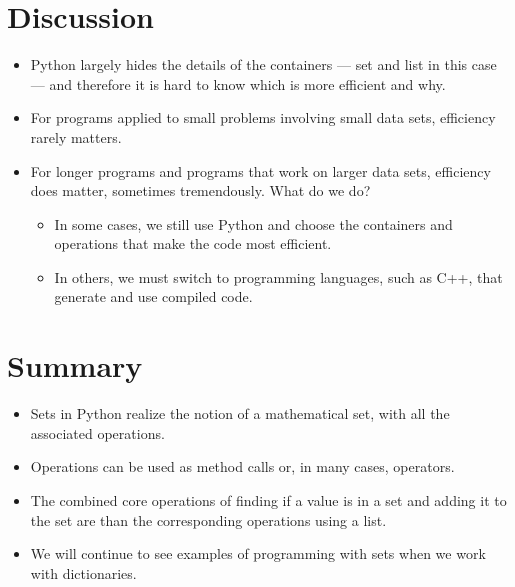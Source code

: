 \documentclass[letterpaper,10pt,english]{sphinxmanual}
\begin{document}
\section{Discussion}
\label{\detokenize{lecture_notes/lec15_sets:discussion}}\begin{itemize}
\item {} 
Python largely hides the details of the containers — set and list in
this case — and therefore it is hard to know which is more efficient
and why.

\item {} 
For programs applied to small problems involving small data sets,
efficiency rarely matters.

\item {} 
For longer programs and programs that work on larger data sets,
efficiency does matter, sometimes tremendously. What do we do?
\begin{itemize}
\item {} 
In some cases, we still use Python and choose the containers and
operations that make the code most efficient.

\item {} 
In others, we must switch to programming languages, such as C++,
that generate and use compiled code.

\end{itemize}

\end{itemize}


\section{Summary}
\label{\detokenize{lecture_notes/lec15_sets:summary}}\begin{itemize}
\item {} 
Sets in Python realize the notion of a mathematical set, with all the
associated operations.

\item {} 
Operations can be used as method calls or, in many cases, operators.

\item {} 
The combined core operations of finding if a value is in a set and
adding it to the set are  than the
corresponding operations using a list.

\item {} 
We will continue to see examples of programming with sets when we
work with dictionaries.

\end{itemize}
\end{document}
